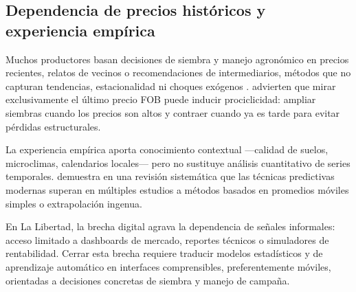 \subsection{Dependencia de precios hist\'oricos y experiencia emp\'irica}

Muchos productores basan decisiones de siembra y manejo agron\'omico en precios recientes, relatos de vecinos o recomendaciones de intermediarios, m\'etodos que no capturan tendencias, estacionalidad ni choques ex\'ogenos \citep{ReisFilho2022}. \citet{VitteryFlores2023} advierten que mirar exclusivamente el \'ultimo precio FOB puede inducir prociclicidad: ampliar siembras cuando los precios son altos y contraer cuando ya es tarde para evitar p\'erdidas estructurales.

La experiencia emp\'irica aporta conocimiento contextual ---calidad de suelos, microclimas, calendarios locales--- pero no sustituye an\'alisis cuantitativo de series temporales. \citet{Theofilou2025} demuestra en una revisi\'on sistem\'atica que las t\'ecnicas predictivas modernas superan en m\'ultiples estudios a m\'etodos basados en promedios m\'oviles simples o extrapolaci\'on ingenua.

En La Libertad, la brecha digital agrava la dependencia de se\~nales informales: acceso limitado a dashboards de mercado, reportes t\'ecnicos o simuladores de rentabilidad. Cerrar esta brecha requiere traducir modelos estad\'isticos y de aprendizaje autom\'atico en interfaces comprensibles, preferentemente m\'oviles, orientadas a decisiones concretas de siembra y manejo de campa\~na.
